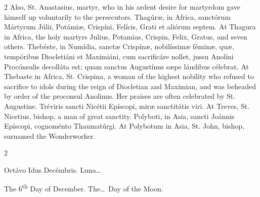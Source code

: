 \begin{paracol}{2}
\switchcolumn
{}
Also, St. Anastasius, martyr, who in 
 his ardent desire for martyrdom gave himself up voluntarily to the 
 persecutors.
\switchcolumn*
{}
Thagúræ, in Africa, 
 sanctórum Mártyrum Júlii, Potámiæ, Crispíni, Felícis, Grati et aliórum 
 septem.
\switchcolumn
{}
At Thagura in Africa, the holy 
 martyrs Julius, Potamias, Crispin, Felix, Gratus, and seven others.
\switchcolumn*
{}
Thebéste, in Numídia, sanctæ Crispínæ, nobilíssimæ féminæ, quæ, tempóribus Diocletiáni et 
 Maximiáni, cum sacrificáre nollet, jussu Anolíni Procónsulis decolláta est; 
 quam sanctus Augustínus sæpe láudibus célebrat.
\switchcolumn
{}
At Thebaste in Africa, St. Crispina, 
 a woman of the highest nobility who refused to sacrifice to idols during the 
 reign of Diocletian and Maximian, and was beheaded by order of the proconsul 
 Anolinus. Her praises are often celebrated by St. Augustine.
\switchcolumn*
{}
Tréviris sancti Nicétii 
 Epíscopi, miræ sanctitátis viri.
\switchcolumn
{}
At Treves, St. Nicetius, bishop, a 
 man of great sanctity.
\switchcolumn*
{}
Polyboti, in Asia, 
 sancti Joánnis Epíscopi, cognoménto Thaumatúrgi.
\switchcolumn
{}
At Polybotum in Asia, St. John, 
 bishop, surnamed the Wonderworker.
\switchcolumn*
{}
\end{paracol}


\begin{paracol}{2}
\begin{center}{\color{gregoriocolor} Octávo Idus Decémbris. 
 Luna\dots\ }\end{center}
\switchcolumn
{}
\begin{center}{\color{gregoriocolor} The 
 6\textsuperscript{th} Day of 
 December. The\dots\ Day of the Moon.}\end{center}
\end{paracol}


